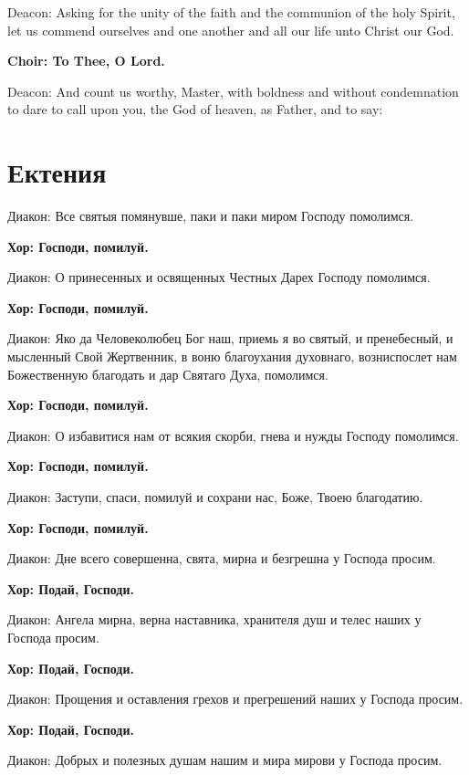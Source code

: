 \documentclass[12pt,a4paper,titlepage]{report}
\begin{document}
\begin{paracol}[1]{2}
  Deacon: Asking for the unity of the faith and the communion of the holy Spirit, let us commend ourselves and one another and all our life unto Christ our God.

  \textbf{Choir: To Thee, O Lord.}

  Deacon: And count us worthy, Master, with boldness and without condemnation to dare to call upon you, the God of heaven, as Father, and to say:

  \switchcolumn[1]

  \section*{Ектения}

  Диакон: Все святыя помянувше, паки и паки миром Господу помолимся.

  \textbf{Хор: Господи, помилуй.}

  Диакон: О принесенных и освященных Честных Дарех Господу помолимся.

  \textbf{Хор: Господи, помилуй.}

  Диакон: Яко да Человеколюбец Бог наш, приемь я во святый, и пренебесный, и мысленный Свой Жертвенник, в воню благоухания духовнаго, возниспослет нам Божественную благодать и дар Святаго Духа, помолимся.

  \textbf{Хор: Господи, помилуй.}

  Диакон:	О избавитися нам от всякия скорби, гнева и нужды Господу помолимся.

  \textbf{Хор: Господи, помилуй.}

  Диакон:	Заступи, спаси, помилуй и сохрани нас, Боже, Твоею благодатию.

  \textbf{Хор: Господи, помилуй.}

  Диакон:	Дне всего совершенна, свята, мирна и безгрешна у Господа просим.

  \textbf{Хор: Подай, Господи.}

  Диакон:	Ангела мирна, верна наставника, хранителя душ и телес наших у Господа просим.

  \textbf{Хор: Подай, Господи.}

  Диакон:	Прощения и оставления грехов и прегрешений наших у Господа просим.

  \textbf{Хор: Подай, Господи.}

  Диакон:	Добрых и полезных душам нашим и мира мирови у Господа просим.


\end{paracol}
\end{document}
